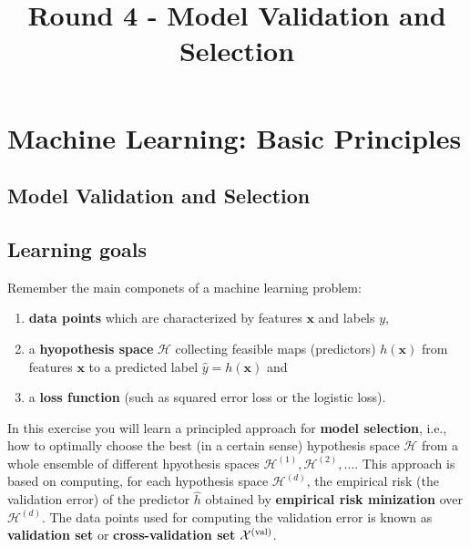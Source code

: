 \documentclass[11pt]{article}
\title{Round 4 - Model Validation and Selection}
\begin{document}
    
    
    \maketitle
    
    

    
    \section{Machine Learning: Basic
Principles}\label{machine-learning-basic-principles}

\subsection{Model Validation and
Selection}\label{model-validation-and-selection}

\subsection{Learning goals}\label{learning-goals}

Remember the main componets of a machine learning problem:

\begin{enumerate}
\def\labelenumi{\arabic{enumi}.}
\item
  \textbf{data points} which are characterized by features
  \(\mathbf{x}\) and labels \(y\),
\item
  a \textbf{hyopothesis space} \(\mathcal{H}\) collecting feasible maps
  (predictors) \(h(\mathbf{x})\) from features \(\mathbf{x}\) to a
  predicted label \(\hat{y}=h(\mathbf{x})\) and
\item
  a \textbf{loss function} (such as squared error loss or the logistic
  loss).
\end{enumerate}

In this exercise you will learn a principled approach for \textbf{model
selection}, i.e., how to optimally choose the best (in a certain sense)
hypothesis space \(\mathcal{H}\) from a whole ensemble of different
hpyothesis spaces \(\mathcal{H}^{(1)},\mathcal{H}^{(2)},\ldots\). This
approach is based on computing, for each hypothesis space
\(\mathcal{H}^{(d)}\), the empirical risk (the validation error) of the
predictor \(\hat{h}\) obtained by \textbf{empirical risk minization}
over \(\mathcal{H}^{(d)}\). The data points used for computing the
validation error is known as \textbf{validation set} or
\textbf{cross-validation set} \(\mathcal{X}^{(\rm val)}\).
\end{document}
